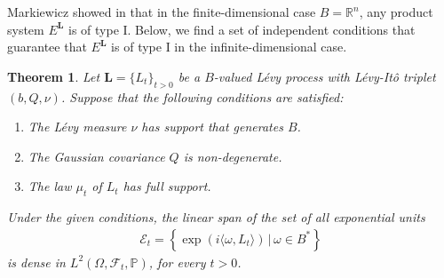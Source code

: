 \documentclass[11pt]{amsart}
\newtheorem{theorem}{Theorem}[section]
\theoremstyle{definition}
\theoremstyle{remark}
\numberwithin{equation}{section}
\begin{document}
Markiewicz showed in \cite{Mar0, Mar1} that in the finite-dimensional case \(B=\mathbb{R}^n\), any product system \(E^{\bm{L}}\) is of type I. Below, we find a set of independent conditions that guarantee that  \(E^{\bm{L}}\)
  is of type I in the infinite-dimensional case.
\begin{theorem}\label{Th1}Let  \( \bm{L} = \{L_t\}_{t > 0} \) be a  \(B\)-valued  L\'evy process with L\'evy-It\^o triplet \((b, Q, \nu)\). Suppose that the following conditions are satisfied: 
\begin{enumerate}
    \item The L\'evy measure \( \nu \) has support that generates \( B \).
    \item The Gaussian covariance \( Q \) is non-degenerate.
    
    \item The law \( \mu_t \) of \( L_t \) has full support.
\end{enumerate}

Under the given conditions, the linear span of the set of all exponential units
\begin{eqnarray}\label{expunit}
\mathcal{E}_t = \left\{ \exp\left( i \langle \omega, L_t \rangle \right)\,|\, \omega \in B^* \right\}
\end{eqnarray}
is dense in \( L^2(\Omega, \mathcal{F}_t, \mathbb{P}) \), for every \(t>0\).

\end{theorem}
\end{document}
